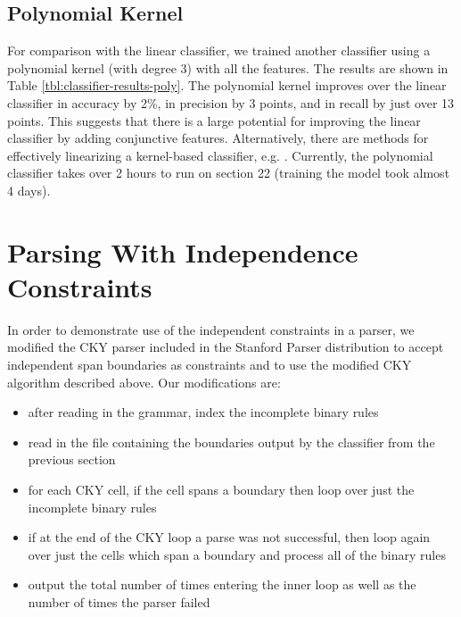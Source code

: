 \documentclass[11pt]{article}
\begin{document}
\subsection{Polynomial Kernel}
\label{sec-4-6}

\label{sec:poly-classifier} For comparison with the linear classifier,
we trained another classifier using a polynomial kernel (with
degree 3) with all the features. The results are shown in Table
\ref{tbl:classifier-results-poly}. The polynomial kernel improves over
the linear classifier in accuracy by 2\%, in precision by 3 points, and
in recall by just over 13 points. This suggests that there is a large
potential for improving the linear classifier by adding conjunctive
features. Alternatively, there are methods for effectively linearizing
a kernel-based classifier, e.g. \cite{Kudo2003,Isozaki2002}.
Currently, the polynomial classifier takes over 2 hours to run on
section 22 (training the model took almost 4 days).



\section{Parsing With Independence Constraints}
\label{sec-5}
\label{sec:parser}

In order to demonstrate use of the independent constraints in a
parser, we modified the CKY parser included in the Stanford Parser
distribution to accept independent span boundaries as constraints and
to use the modified CKY algorithm described above. Our modifications
are:

\begin{itemize}
\item after reading in the grammar, index the incomplete binary rules
\item read in the file containing the boundaries output by the classifier
from the previous section
\item for each CKY cell, if the cell spans a boundary then loop over just
the incomplete binary rules
\item if at the end of the CKY loop a parse was not successful, then loop
again over just the cells which span a boundary and process all of
the binary rules
\item output the total number of times entering the inner loop as well as the
number of times the parser failed
\end{itemize}
\end{document}
